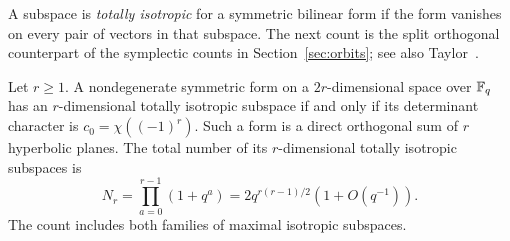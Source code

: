 A subspace is \emph{totally isotropic} for a symmetric bilinear form
if the form vanishes on every pair of vectors in that subspace.
The next count is the split orthogonal counterpart of the symplectic
counts in Section~\ref{sec:orbits}; see also Taylor~\cite[Exercise~11.3]{taylor1992}.

\begin{lemma}
\label{lem:transverse-split}
Let $r\geq1$. A nondegenerate symmetric form on a $2r$-dimensional
space over $\mathbb F_q$
has an $r$-dimensional totally isotropic subspace if and only if its
determinant character is $c_0=\chi((-1)^r)$. Such a form is a direct
orthogonal sum of $r$ hyperbolic planes. The total number of its
$r$-dimensional totally isotropic subspaces is
\begin{equation}
\label{eq:transverse-isotropic-count}
 N_r=\prod_{a=0}^{r-1}(1+q^a)
 =2q^{r(r-1)/2}(1+O(q^{-1})).
\end{equation}
The count includes both families of maximal isotropic subspaces.
\end{lemma}

